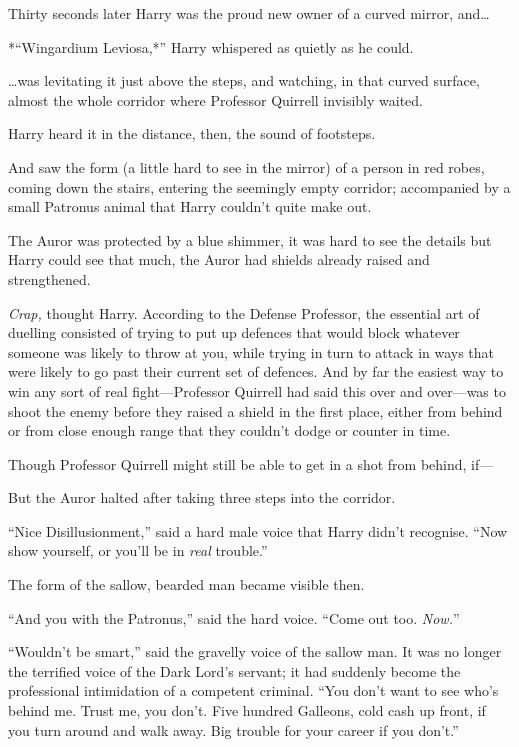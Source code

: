 Thirty seconds later Harry was the proud new owner of a curved mirror,
and\ldots{}

*``Wingardium Leviosa,*'' Harry whispered as quietly as he could.

\ldots{}was levitating it just above the steps, and watching, in that
curved surface, almost the whole corridor where Professor Quirrell
invisibly waited.

Harry heard it in the distance, then, the sound of footsteps.

And saw the form (a little hard to see in the mirror) of a person in red
robes, coming down the stairs, entering the seemingly empty corridor;
accompanied by a small Patronus animal that Harry couldn't quite make
out.

The Auror was protected by a blue shimmer, it was hard to see the
details but Harry could see that much, the Auror had shields already
raised and strengthened.

\emph{Crap,} thought Harry. According to the Defense Professor, the
essential art of duelling consisted of trying to put up defences that
would block whatever someone was likely to throw at you, while trying in
turn to attack in ways that were likely to go past their current set of
defences. And by far the easiest way to win any sort of real
fight---Professor Quirrell had said this over and over---was to shoot
the enemy before they raised a shield in the first place, either from
behind or from close enough range that they couldn't dodge or counter in
time.

Though Professor Quirrell might still be able to get in a shot from
behind, if---

But the Auror halted after taking three steps into the corridor.

``Nice Disillusionment,'' said a hard male voice that Harry didn't
recognise. ``Now show yourself, or you'll be in \emph{real} trouble.''

The form of the sallow, bearded man became visible then.

``And you with the Patronus,'' said the hard voice. ``Come out too.
\emph{Now.}''

``Wouldn't be smart,'' said the gravelly voice of the sallow man. It was
no longer the terrified voice of the Dark Lord's servant; it had
suddenly become the professional intimidation of a competent criminal.
``You don't want to see who's behind me. Trust me, you don't. Five
hundred Galleons, cold cash up front, if you turn around and walk away.
Big trouble for your career if you don't.''

